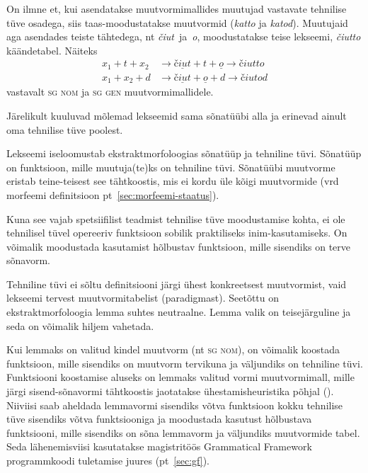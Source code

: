 \documentclass[12pt,a4paper]{article}
\newcommand{\vadja}[1]{\textit{#1}}
\newcommand{\msd}[1]{\textsc{#1}}
\begin{document}
On ilmne et, kui asendatakse muutvormimallides muutujad vastavate tehnilise tüve osadega, siis taas-moodustatakse muutvormid (\vadja{katto} ja \vadja{katod}). Muutujaid aga asendades teiste tähtedega, %
nt \textit{čiut}~ja~\textit{o}, moodustatakse teise lekseemi, \vadja{čiutto} käändetabel. Näiteks
\begin{align*}
  x_1 + t + x_2 &\rightarrow \underline{\textit{čiut}} + \textit{t} + \underline{\textit{o}} \rightarrow \textit{čiutto} \nonumber \\
  x_1 + x_2 + d &\rightarrow \underline{\textit{čiut}} + \underline{\textit{o}} + \textit{d} \rightarrow \textit{čiutod} \nonumber
\end{align*}
vastavalt \msd{sg nom} ja \msd{sg gen} muutvormi\-mallidele.

Järelikult kuuluvad mõlemad lekseemid sama sõnatüübi alla ja erinevad ainult oma tehnilise tüve poolest.

Lekseemi iseloomustab ekstraktmorfoloogias sõnatüüp ja tehniline tüvi. Sõnatüüp on funktsioon, mille muutuja(te)ks on tehniline tüvi. Sõnatüübi muutvorme eristab teine-teisest see tähtkoostis, mis ei kordu üle kõigi muutvormide (vrd morfeemi definitsioon pt~\ref{sec:morfeemi-staatus}).

Kuna see vajab spetsiifilist teadmist tehnilise tüve moodustamise kohta, ei ole tehnilisel tüvel opereeriv funktsioon sobilik praktiliseks inim-kasutamiseks. On võimalik moodustada kasutamist hõlbustav funktsioon, mille sisendiks on terve sõnavorm.

Tehniline tüvi ei sõltu definitsiooni järgi ühest konkreetsest muutvormist, vaid lekseemi tervest muutvormi\-tabelist (paradigmast). Seetõttu on ekstrakt\-morfoloogia lemma suhtes neutraalne. Lemma valik on teise\-järguline ja seda on võimalik hiljem vahetada. %

Kui lemmaks on valitud kindel muutvorm (nt \msd{sg nom}), on võimalik koostada funktsioon, mille sisendiks on muutvorm tervikuna ja väljundiks on tehniline tüvi. Funktsiooni koostamise aluseks on lemmaks valitud vormi muutvormi\-mall, mille järgi sisend-sõnavormi tähtkoostis jaotatakse ühestamisheuristika põhjal (\cite[572]{ahlberg_semi-supervised_2014}). Niiviisi saab aheldada lemmavormi sisendiks võtva funktsioon kokku tehnilise tüve sisendiks võtva funktsiooniga ja moodustada kasutust hõlbustava funktsiooni, mille sisendiks on sõna lemmavorm ja väljundiks muutvormide tabel. Seda lähenemisviisi kasutatakse magistritöös Grammatical Framework programmkoodi tuletamise juures (pt~\ref{sec:gf}). %
\end{document}
